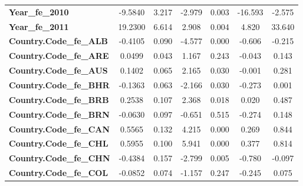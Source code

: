 \begin{center}
\begin{tabular}{lcccccc}
\textbf{Year\_fe\_2010}                                            &      -9.5840  &        3.217     &    -2.979  &         0.003        &      -16.593    &       -2.575     \\
\textbf{Year\_fe\_2011}                                            &      19.2300  &        6.614     &     2.908  &         0.004        &        4.820    &       33.640     \\
\textbf{Country.Code\_fe\_ALB}                                     &      -0.4105  &        0.090     &    -4.577  &         0.000        &       -0.606    &       -0.215     \\
\textbf{Country.Code\_fe\_ARE}                                     &       0.0499  &        0.043     &     1.167  &         0.243        &       -0.043    &        0.143     \\
\textbf{Country.Code\_fe\_AUS}                                     &       0.1402  &        0.065     &     2.165  &         0.030        &       -0.001    &        0.281     \\
\textbf{Country.Code\_fe\_BHR}                                     &      -0.1363  &        0.063     &    -2.166  &         0.030        &       -0.273    &        0.001     \\
\textbf{Country.Code\_fe\_BRB}                                     &       0.2538  &        0.107     &     2.368  &         0.018        &        0.020    &        0.487     \\
\textbf{Country.Code\_fe\_BRN}                                     &      -0.0630  &        0.097     &    -0.651  &         0.515        &       -0.274    &        0.148     \\
\textbf{Country.Code\_fe\_CAN}                                     &       0.5565  &        0.132     &     4.215  &         0.000        &        0.269    &        0.844     \\
\textbf{Country.Code\_fe\_CHL}                                     &       0.5955  &        0.100     &     5.941  &         0.000        &        0.377    &        0.814     \\
\textbf{Country.Code\_fe\_CHN}                                     &      -0.4384  &        0.157     &    -2.799  &         0.005        &       -0.780    &       -0.097     \\
\textbf{Country.Code\_fe\_COL}                                     &      -0.0852  &        0.074     &    -1.157  &         0.247        &       -0.245    &        0.075     \\

\end{tabular}
\end{center}
